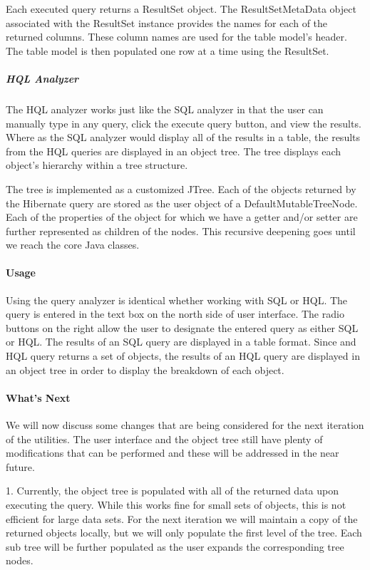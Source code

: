 Each executed query returns a ResultSet object. The ResultSetMetaData object associated with the ResultSet instance provides the names for each of the returned columns. These column names are used for the table model's header. The table model is then populated one row at a time using the ResultSet.

\subparagraph{HQL Analyzer}

The HQL analyzer works just like the SQL analyzer in that the user can manually type in any query, click the execute query button, and view the results. Where as the SQL analyzer would display all of the results in a table, the results from the HQL queries are displayed in an object tree. The tree displays each object's hierarchy within a tree structure.

The tree is implemented as a customized JTree. Each of the objects returned by the Hibernate query are stored as the user object of a DefaultMutableTreeNode. Each of the properties of the object for which we have a getter and/or setter are further represented as children of the nodes. This recursive deepening goes until we reach the core Java classes.

\paragraph{Usage}
Using the query analyzer is identical whether working with SQL or HQL. The query is entered in the text box on the north side of user interface. The radio buttons on the right allow the user to designate the entered query as either SQL or HQL. The results of an SQL query are displayed in a table format. Since and HQL query returns a set of objects, the results of an HQL query are displayed in an object tree in order to display the breakdown of each object.

\paragraph{What's Next}
We will now discuss some changes that are being considered for the next iteration of the utilities. The user interface and the object tree still have plenty of modifications that can be performed and these will be addressed in the near future.

1. Currently, the object tree is populated with all of the returned data upon executing the query. While this works fine for small sets of objects, this is not efficient for large data sets. For the next iteration we will maintain a copy of the returned objects locally, but we will only populate the first level of the tree. Each sub tree will be further populated as the user expands the corresponding tree nodes.

